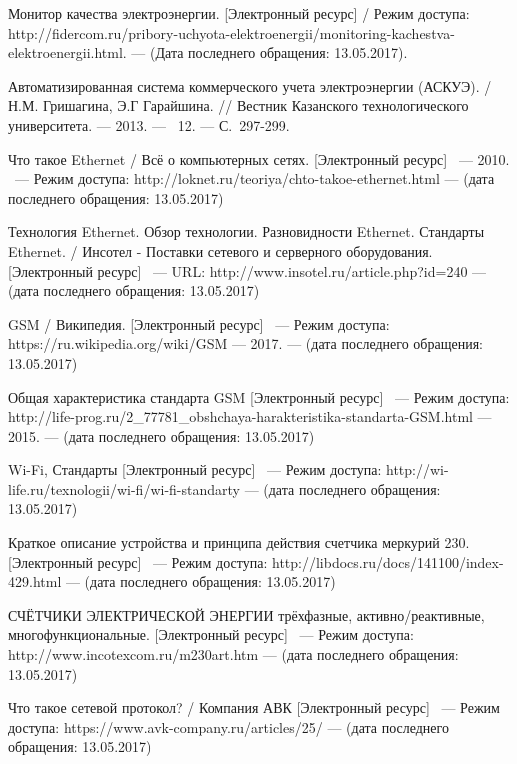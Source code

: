 \documentclass[utf8x,12pt, coursreport]{G7-32}
\begin{document}
\begin{thebibliography}{99}

 Монитор качества электроэнергии. [Электронный ресурс] /  Режим доступа: http://fidercom.ru/pribory-uchyota-elektroenergii/monitoring-kachestva-\\elektroenergii.html. --- (Дата последнего обращения: 13.05.2017).

 Автоматизированная система коммерческого учета электроэнергии (АСКУЭ). / Н.М. Гришагина, Э.Г Гарайшина. // Вестник Казанского технологического университета. --- 2013. --- \No~12. --- С.~297-299.

 Что такое Ethernet / Всё о компьютерных сетях. [Электронный ресурс] ~--- 2010. ~--- Режим доступа: http://loknet.ru/teoriya/chto-takoe-ethernet.html --- (дата последнего обращения: 13.05.2017)

 Технология Ethernet. Обзор технологии. Разновидности Ethernet. Стандарты Ethernet. / Инсотел - Поставки сетевого и серверного оборудования. [Электронный ресурс] ~--- URL: http://www.insotel.ru/article.php?id=240 --- (дата последнего обращения: 13.05.2017)

 GSM / Википедия. [Электронный ресурс] ~--- Режим доступа: https://ru.wikipedia.org/wiki/GSM --- 2017. --- (дата последнего обращения: 13.05.2017)

 Общая характеристика стандарта GSM [Электронный ресурс] ~--- Режим доступа: http://life-prog.ru/2\_77781\_obshchaya-harakteristika-standarta-GSM.html  --- 2015. --- (дата последнего обращения: 13.05.2017)

 Wi-Fi, Стандарты [Электронный ресурс] ~--- Режим доступа: http://wi-life.ru/texnologii/wi-fi/wi-fi-standarty --- (дата последнего обращения: 13.05.2017)

 Краткое описание устройства и принципа действия счетчика меркурий 230. [Электронный ресурс] ~--- Режим доступа: http://libdocs.ru/docs/141100/index-429.html --- (дата последнего обращения: 13.05.2017)

 СЧЁТЧИКИ ЭЛЕКТРИЧЕСКОЙ ЭНЕРГИИ 
трёхфазные, активно/реактивные, многофункциональные. [Электронный ресурс] ~--- Режим доступа: http://www.incotexcom.ru/m230art.htm --- (дата последнего обращения: 13.05.2017)

 Что такое сетевой протокол? / Компания АВК [Электронный ресурс] ~--- Режим доступа: https://www.avk-company.ru/articles/25/ --- (дата последнего обращения: 13.05.2017)


\end{thebibliography}
\end{document}

